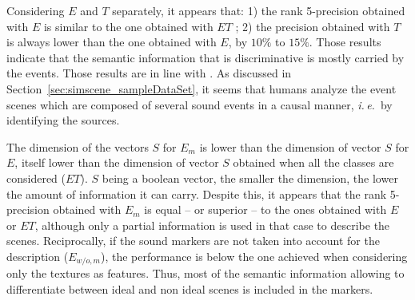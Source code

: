 \documentclass[12pt]{elsarticle}
\newcommand{\ie}{\emph{i.\,e.}}
\begin{document}
Considering $E$ and $T$ separately, it appears that: 1) the rank 5-precision obtained with $E$ is similar to the one obtained with $ET$ ; 2) the precision obtained with $T$ is always lower than the one obtained with $E$, by $10\%$ to $15\%$. Those results indicate that the semantic information that is discriminative is mostly carried by the events. Those results are in line with \cite{maffiolo_caracterisation_1999}. As discussed in Section~\ref{sec:simscene_sampleDataSet}, it seems that humans analyze the event scenes which are composed of several sound events in a causal manner, \ie~by identifying the sources.


The dimension of the vectors $S$ for $E_m$ is lower than the dimension of vector $S$ for $E$, itself lower than the dimension of vector $S$ obtained when all the classes are considered ($ET$). $S$ being a boolean vector, the smaller the dimension, the lower the amount of information it can carry. Despite this, it appears that the rank 5-precision obtained with $E_m$ is equal – or superior – to the ones obtained with $E$ or $ET$, although only a partial information is used in that case to describe the scenes. Reciprocally, if the sound markers are not taken into account for the description ($E_{w/o,m}$), the performance is below the one achieved when considering only the textures as features. Thus, most of the semantic information allowing to differentiate between ideal and non ideal scenes is included in the markers.

%
\end{document}
